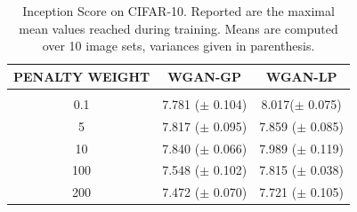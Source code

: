 \documentclass{article} %
\newcommand{\af}[1]{\textcolor{blue}{#1}}
\begin{document}

 
 
\begin{table}[t]
\begin{center}
\begin{tabular}{ccc}
 \multicolumn{1}{c}{\bf PENALTY WEIGHT}  & \multicolumn{1}{c}{\bf WGAN-GP} & \multicolumn{1}{c}{\bf WGAN-LP}
\\ \hline \\
0.1 & 7.781 ($\pm$ 0.104) &   8.017($\pm$ 0.075) \\
5 &  7.817 ($\pm$ 0.095) &  7.859   ($\pm$ 0.085)\\
         10 & 7.840 ($\pm$ 0.066)   &  7.989 ($\pm$ 0.119) \\
  100 & 7.548 ($\pm$ 0.102) & 7.815 ($\pm$ 0.038) \\       
 200 & 7.472 ($\pm$ 0.070) &  7.721 ($\pm$ 0.105)\\
\end{tabular}
\caption{Inception Score on CIFAR-10. Reported are the  maximal  mean values reached during training.
Means are computed over 10 image sets, variances given in parenthesis. 
}
\label{tab:IS}
\end{center}
\end{table}
\end{document}

